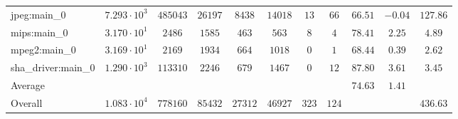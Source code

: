 \begin{tabular}{|l|c|c|c|c|c|c|c|c|c|c|}
jpeg:main\_0            & $ 7.293 \cdot 10^{3} $ & $ 485043 $ & $ 26197 $ & $ 8438  $ & $ 14018 $ & $ 13  $ & $ 66  $ & $ 66.51       $ & $ -0.04   $ & $ 127.86  $ \\
mips:main\_0            & $ 3.170 \cdot 10^{1} $ & $ 2486   $ & $ 1585  $ & $ 463   $ & $ 563   $ & $ 8   $ & $ 4   $ & $ 78.41       $ & $ 2.25    $ & $ 4.89    $ \\
mpeg2:main\_0           & $ 3.169 \cdot 10^{1} $ & $ 2169   $ & $ 1934  $ & $ 664   $ & $ 1018  $ & $ 0   $ & $ 1   $ & $ 68.44       $ & $ 0.39    $ & $ 2.62    $ \\
sha\_driver:main\_0     & $ 1.290 \cdot 10^{3} $ & $ 113310 $ & $ 2246  $ & $ 679   $ & $ 1467  $ & $ 0   $ & $ 12  $ & $ 87.80       $ & $ 3.61    $ & $ 3.45    $ \\
\hline
Average                 & $                    $ & $        $ & $       $ & $       $ & $       $ & $     $ & $     $ & $ 74.63       $ & $ 1.41    $ & $         $ \\
\hline
Overall                 & $ 1.083 \cdot 10^{4} $ & $ 778160 $ & $ 85432 $ & $ 27312 $ & $ 46927 $ & $ 323 $ & $ 124 $ & $             $ & $         $ & $ 436.63  $ \\
\hline
\end{tabular}
